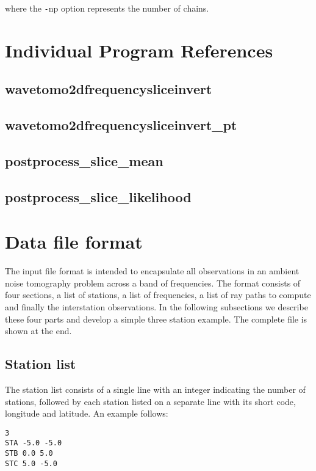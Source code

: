 \documentclass[a4paper,12pt]{article}
\begin{document}
where the {\texttt -np} option represents the number of chains.

\appendix

\section{Individual Program References}

\subsection{wavetomo2dfrequencysliceinvert}

\subsection{wavetomo2dfrequencysliceinvert\_pt}

\subsection{postprocess\_slice\_mean}

\subsection{postprocess\_slice\_likelihood}


\section{Data file format}
\label{sec:fileformat}

The input file format is intended to encapsulate all observations in
an ambient noise tomography problem across a band of frequencies. The
format consists of four sections, a list of stations, a list of
frequencies, a list of ray paths to compute and finally the
interstation observations.  In the following subsections we describe
these four parts and develop a simple three station example. The
complete file is shown at the end.

\subsection{Station list}

The station list consists of a single line with an integer indicating
the number of stations, followed by each station listed on a separate
line with its short code, longitude and latitude. An example follows:

\begin{verbatim}
3
STA -5.0 -5.0
STB 0.0 5.0
STC 5.0 -5.0
\end{verbatim}
\end{document}
